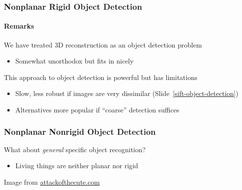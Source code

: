 \documentclass[xetex,professionalfont]{beamer}
\begin{document}
\begin{frame}
\frametitle{Nonplanar Rigid Object Detection}
\framesubtitle{Remarks}

We have treated 3D reconstruction as an object detection problem
\begin{itemize}
    \item Somewhat unorthodox but fits in nicely
\end{itemize}

\bigskip
This approach to object detection is powerful but has limitations
\begin{itemize}
    \item Slow, less robust if images are very dissimilar (Slide~\ref{sift-object-detection})
    \item Alternatives more popular if \enquote{coarse} detection suffices %
\end{itemize}

\end{frame}


{
\begin{frame}


\end{frame}
}


\begin{frame}
\frametitle{Nonplanar Nonrigid Object Detection}

What about \textit{general} specific object recognition?
\begin{itemize}
    \item Living things are neither planar nor rigid
\end{itemize}

\medskip
\begin{center}
    {\centering Image from \url{attackofthecute.com}}
\end{center}

\end{frame}
\end{document}
